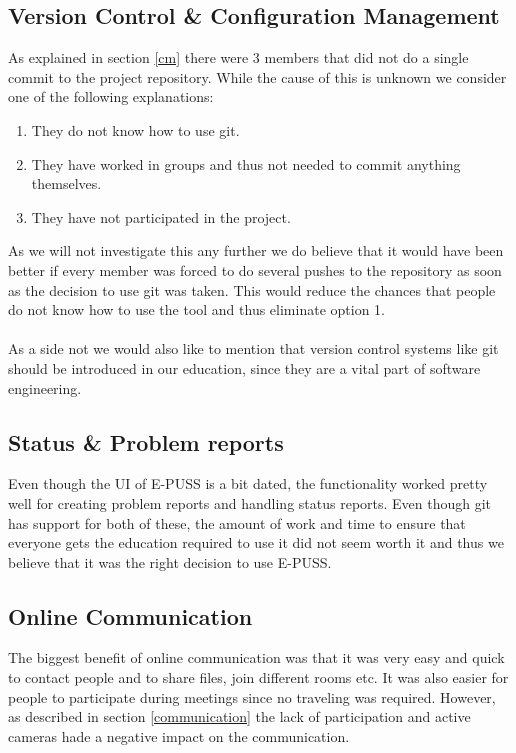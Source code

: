 \documentclass{article}
\begin{document}
    \subsection{Version Control \& Configuration Management}
        As explained in section \ref{cm} there were 3 members that did not do a single
        commit to the project repository. While the cause of this is unknown we consider %
        one of the following explanations:
        \begin{enumerate}
            \item They do not know how to use git.
            \item They have worked in groups and thus not needed to commit anything themselves.
            \item They have not participated in the project.
        \end{enumerate}
        As we will not investigate this any further we do believe that it would have been
        better if every member was forced to do several pushes to the repository as soon
        as the decision to use git was taken. This would reduce the chances that people
        do not know how to use the tool and thus eliminate option 1. 
        \\ \\
        As a side not we would also like to mention that version control systems like git
        should be introduced in our education, since they are a vital part of
        software engineering.
    
    \subsection{Status \& Problem reports}
        Even though the UI of E-PUSS is a bit dated, the functionality worked
        pretty well for creating problem reports and handling status reports.
        Even though git has support for both of these, the amount of work and time to ensure
        that everyone gets the education required to use it did not seem worth it and thus
        we believe that it was the right decision to use E-PUSS.
    
    \subsection{Online Communication}
        The biggest benefit of online communication was that it was very easy and quick to
        contact people and to share files, join different rooms etc. It was also easier for
        people to participate during meetings since no traveling was required.
        However, as described in section \ref{communication} the lack of participation and active cameras
        hade a negative impact on the communication.
    
\end{document}
